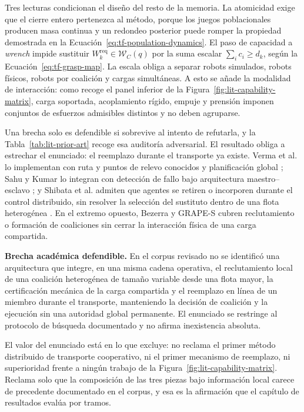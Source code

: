 Tres lecturas condicionan el diseño del resto de la memoria. La atomicidad exige que el
cierre entero pertenezca al método, porque los juegos poblacionales producen masa
continua y un redondeo posterior puede romper la propiedad demostrada en la
Ecuación~\eqref{eq:tf-population-dynamics}. El paso de capacidad a \emph{wrench} impide
sustituir $W_k^{\mathrm{req}} \in \mathcal W_C(q)$ por la suma escalar
$\sum_i c_i \ge d_k$, según la Ecuación~\eqref{eq:tf-grasp-map}. La escala obliga a
separar robots simulados, robots físicos, robots por coalición y cargas simultáneas.
A esto se añade la modalidad de interacción: como recoge el panel inferior de la
Figura~\ref{fig:lit-capability-matrix}, carga soportada, acoplamiento rígido, empuje y
prensión imponen conjuntos de esfuerzos admisibles distintos y no deben agruparse.



Una brecha solo es defendible si sobrevive al intento de refutarla, y la
Tabla~\ref{tab:lit-prior-art} recoge esa auditoría adversarial. El resultado obliga a
estrechar el enunciado: el reemplazo durante el transporte ya existe. Verma et al. lo
implementan con ruta y puntos de relevo conocidos y planificación global
\parencite{verma2019replacement}; Sahu y Kumar lo integran con detección de fallo bajo
arquitectura maestro--esclavo \parencite{sahuKumar2026FaultManagement}; y Shibata et al.
admiten que agentes se retiren o incorporen durante el control distribuido, sin resolver
la selección del sustituto dentro de una flota heterogénea \parencite{shibata2023event}.
En el extremo opuesto, Bezerra y GRAPE-S cubren reclutamiento o formación de coaliciones
sin cerrar la interacción física de una carga compartida.

\begin{tcolorbox}[enhanced,breakable,colback=VIUOrange!5,colframe=VIUOrange,
  boxrule=0.45pt,leftrule=2.8pt,arc=1.2mm,left=2.5mm,right=2.5mm,top=1.8mm,bottom=1.8mm]
\textbf{Brecha académica defendible.} En el corpus revisado no se identificó una
arquitectura que integre, en una misma cadena operativa, el reclutamiento local de una
coalición heterogénea de tamaño variable desde una flota mayor, la certificación
mecánica de la carga compartida y el reemplazo en línea de un miembro durante el
transporte, manteniendo la decisión de coalición y la ejecución sin una autoridad global
permanente. El enunciado se restringe al protocolo de búsqueda documentado y no afirma
inexistencia absoluta.
\end{tcolorbox}

El valor del enunciado está en lo que excluye: no reclama el primer método distribuido
de transporte cooperativo, ni el primer mecanismo de reemplazo, ni superioridad frente a
ningún trabajo de la Figura~\ref{fig:lit-capability-matrix}. Reclama solo que la
composición de las tres piezas bajo información local carece de precedente documentado
en el corpus, y esa es la afirmación que el capítulo de resultados evalúa por tramos.
